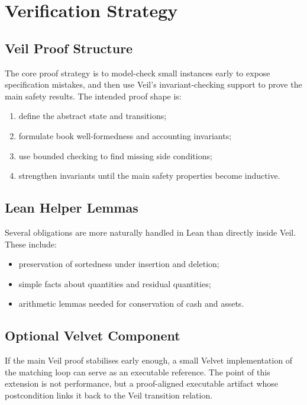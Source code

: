 \section{Verification Strategy}

\subsection{Veil Proof Structure}

The core proof strategy is to model-check small instances early to expose
specification mistakes, and then use Veil's invariant-checking support to prove
the main safety results. The intended proof shape is:

\begin{enumerate}[leftmargin=1.5em]
\item define the abstract state and transitions;
\item formulate book well-formedness and accounting invariants;
\item use bounded checking to find missing side conditions;
\item strengthen invariants until the main safety properties become inductive.
\end{enumerate}

\subsection{Lean Helper Lemmas}

Several obligations are more naturally handled in Lean than directly inside
Veil. These include:

\begin{itemize}[leftmargin=1.5em]
\item preservation of sortedness under insertion and deletion;
\item simple facts about quantities and residual quantities;
\item arithmetic lemmas needed for conservation of cash and assets.
\end{itemize}

\subsection{Optional Velvet Component}

If the main Veil proof stabilises early enough, a small Velvet implementation
of the matching loop can serve as an executable reference. The point of this
extension is not performance, but a proof-aligned executable artifact whose
postcondition links it back to the Veil transition relation.

